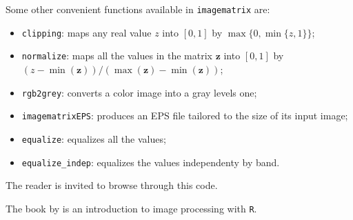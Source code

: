 Some other convenient functions available in \verb|imagematrix| are:
\begin{itemize}
\item \verb|clipping|: maps any real value $z$ into $[0,1]$ by $\max\{0,\min\{z, 1\}\}$;
\item \verb|normalize|: maps all the values in the matrix $\bm z$ into $[0,1]$ by $(z - \min(\bm z))/(\max(\bm z) - \min(\bm z))$;
\item \verb|rgb2grey|: converts a color image into a gray levels one;
\item \verb|imagematrixEPS|: produces an EPS file tailored to the size of its input image;
\item \verb|equalize|: equalizes all the values;
\item \verb|equalize_indep|: equalizes the values independenty by band.
\end{itemize}
The reader is invited to browse through this code.

The book by \citet{IntroImageProcessingR} is an introduction to image processing with \texttt{R}.